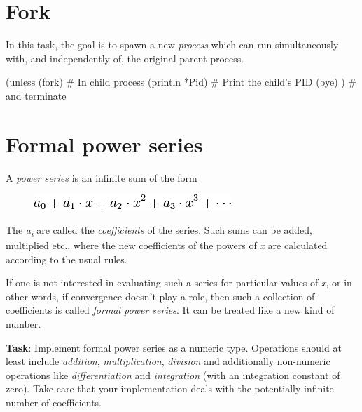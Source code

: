 \pagebreak{}
\section*{Fork}

In this task, the goal is to spawn a new \emph{process} which can run
simultaneously with, and independently of, the original parent
process.

\begin{wideverbatim}

(unless (fork)                         # In child process
   (println *Pid)                      # Print the child's PID
   (bye) )                             # and terminate

\end{wideverbatim}

\pagebreak{}
\section*{Formal power series}

A \emph{power series} is an infinite sum of the form

\begin{figure}[htbp]
\centering
\includegraphics[scale=.6]{graphics/c0f960b20df765fdc843e8c076225d5e.png}
\end{figure}

The \emph{a\textsubscript{i}} are called the \emph{coefficients} of the
series. Such sums can be added, multiplied etc., where the new
coefficients of the powers of \emph{x} are calculated according to the
usual rules.

If one is not interested in evaluating such a series for particular
values of \emph{x}, or in other words, if convergence doesn't play a
role, then such a collection of coefficients is called \emph{formal
power series}. It can be treated like a new kind of number.

\textbf{Task}: Implement formal power series as a numeric type.
Operations should at least include \emph{addition},
\emph{multiplication}, \emph{division} and additionally non-numeric
operations like \emph{differentiation} and \emph{integration} (with an
integration constant of zero). Take care that your implementation deals
with the potentially infinite number of coefficients.


